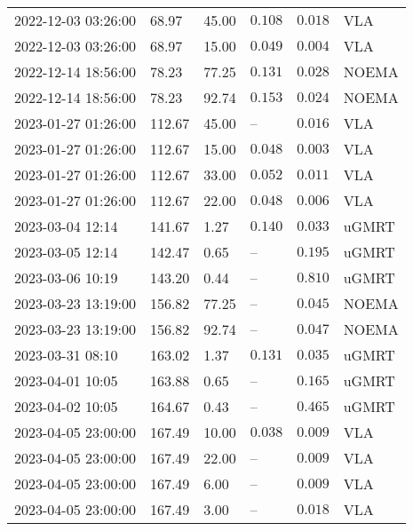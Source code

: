 \documentclass{nature_plusfigure}
\begin{document}
\begin{supplement}
\begin{center}
\begin{longtable}{llllll}
2022-12-03 03:26:00 & 68.97 & 45.00 & $0.108$ & $0.018$ & VLA \\ 
2022-12-03 03:26:00 & 68.97 & 15.00 & $0.049$ & $0.004$ & VLA \\ 
2022-12-14 18:56:00 & 78.23 & 77.25 & $0.131$ & $0.028$ & NOEMA \\ 
2022-12-14 18:56:00 & 78.23 & 92.74 & $0.153$ & $0.024$ & NOEMA \\ 
2023-01-27 01:26:00 & 112.67 & 45.00 & -- & $0.016$ & VLA \\ 
2023-01-27 01:26:00 & 112.67 & 15.00 & $0.048$ & $0.003$ & VLA \\ 
2023-01-27 01:26:00 & 112.67 & 33.00 & $0.052$ & $0.011$ & VLA \\ 
2023-01-27 01:26:00 & 112.67 & 22.00 & $0.048$ & $0.006$ & VLA \\ 
2023-03-04 12:14 & 141.67 & 1.27 & $0.140$ & $0.033$ & uGMRT \\ 
2023-03-05 12:14 & 142.47 & 0.65 & -- & $0.195$ & uGMRT \\ 
2023-03-06 10:19 & 143.20 & 0.44 & -- & $0.810$ & uGMRT \\ 
2023-03-23 13:19:00 & 156.82 & 77.25 & -- & $0.045$ & NOEMA \\ 
2023-03-23 13:19:00 & 156.82 & 92.74 & -- & $0.047$ & NOEMA \\ 
2023-03-31 08:10 & 163.02 & 1.37 & $0.131$ & $0.035$ & uGMRT \\ 
2023-04-01 10:05 & 163.88 & 0.65 & -- & $0.165$ & uGMRT \\ 
2023-04-02 10:05 & 164.67 & 0.43 & -- & $0.465$ & uGMRT \\ 
2023-04-05 23:00:00 & 167.49 & 10.00 & $0.038$ & $0.009$ & VLA \\ 
2023-04-05 23:00:00 & 167.49 & 22.00 & -- & $0.009$ & VLA \\ 
2023-04-05 23:00:00 & 167.49 & 6.00 & -- & $0.009$ & VLA \\ 
2023-04-05 23:00:00 & 167.49 & 3.00 & -- & $0.018$ & VLA \\ 
\hline 
\end{longtable} 
\end{center} 


\end{supplement}

\end{document}
